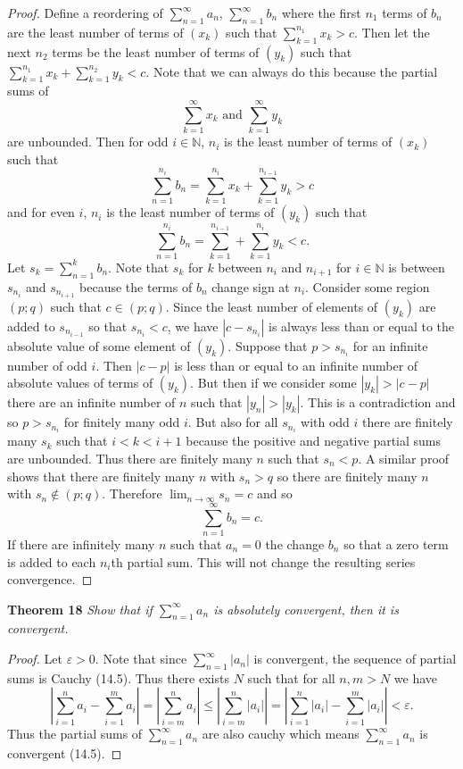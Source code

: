 \documentclass{article}
\begin{document}
\begin{flushleft}
\begin{proof}
Define a reordering of $\sum_{n=1}^{\infty} a_n$, $\sum_{n=1}^{\infty} b_n$ where the first $n_1$ terms of $b_n$ are the least number of terms of $(x_k)$ such that $\sum_{k=1}^{n_1} x_k > c$. Then let the next $n_2$ terms be the least number of terms of $(y_k)$ such that $\sum_{k=1}^{n_1} x_k + \sum_{k=1}^{n_2} y_k < c$. Note that we can always do this because the partial sums of
\[
\sum_{k=1}^{\infty} x_k \text{ and } \sum_{k=1}^{\infty} y_k
\]
are unbounded. Then for odd $i \in \mathbb{N}$, $n_i$ is the least number of terms of $(x_k)$ such that
\[
\sum_{n=1}^{n_i} b_n = \sum_{k=1}^{n_i} x_k + \sum_{k=1}^{n_{i-1}} y_k > c
\]
and for even $i$, $n_i$ is the least number of terms of $(y_k)$ such that
\[
\sum_{n=1}^{n_i} b_n = \sum_{k=1}^{n_{i-1}} + \sum_{k=1}^{n_i} y_k < c.
\]
Let $s_k = \sum_{n=1}^{k} b_n$. Note that $s_k$ for $k$ between $n_i$ and $n_{i+1}$ for $i \in \mathbb{N}$ is between $s_{n_i}$ and $s_{n_{i+1}}$ because the terms of $b_n$ change sign at $n_i$. Consider some region $(p;q)$ such that $c \in (p;q)$. Since the least number of elements of $(y_k)$ are added to $s_{n_{i-1}}$ so that $s_{n_i} < c$, we have $|c - s_{n_i}|$ is always less than or equal to the absolute value of some element of $(y_k)$. Suppose that $p > s_{n_i}$ for an infinite number of odd $i$. Then $|c-p|$ is less than or equal to an infinite number of absolute values of terms of $(y_k)$. But then if we consider some $|y_k| > |c-p|$ there are an infinite number of $n$ such that $|y_n| > |y_k|$. This is a contradiction and so $p > s_{n_i}$ for finitely many odd $i$. But also for all $s_{n_i}$ with odd $i$ there are finitely many $s_k$ such that $i < k < i+1$ because the positive and negative partial sums are unbounded. Thus there are finitely many $n$ such that $s_n < p$. A similar proof shows that there are finitely many $n$ with $s_n > q$ so there are finitely many $n$ with $s_n \notin (p;q)$. Therefore $\lim_{n \rightarrow \infty} s_n = c$ and so
\[
\sum_{n=1}^{\infty} b_n = c.
\]
If there are infinitely many $n$ such that $a_n=0$ the change $b_n$ so that a zero term is added to each $n_i$th partial sum. This will not change the resulting series convergence.
\end{proof}

\textbf{Theorem 18}
\textsl{Show that if $\sum_{n=1}^{\infty} a_n$ is absolutely convergent, then it is convergent.}
\begin{proof}
Let $\varepsilon > 0$. Note that since $\sum_{n=1}^{\infty} |a_n|$ is convergent, the sequence of partial sums is Cauchy (14.5). Thus there exists $N$ such that for all $n,m > N$ we have
\[
\left | \sum_{i=1}^n a_i - \sum_{i=1}^m a_i \right | = \left | \sum_{i=m}^n a_i \right | \leq \left | \sum_{i=m}^n |a_i| \right | = \left | \sum_{i=1}^n |a_i| - \sum_{i=1}^m |a_i| \right | < \varepsilon.
\]
Thus the partial sums of $\sum_{n=1}^{\infty} a_n$ are also cauchy which means $\sum_{n=1}^{\infty} a_n$ is convergent (14.5).
\end{proof}

\end{flushleft}
\end{document}
